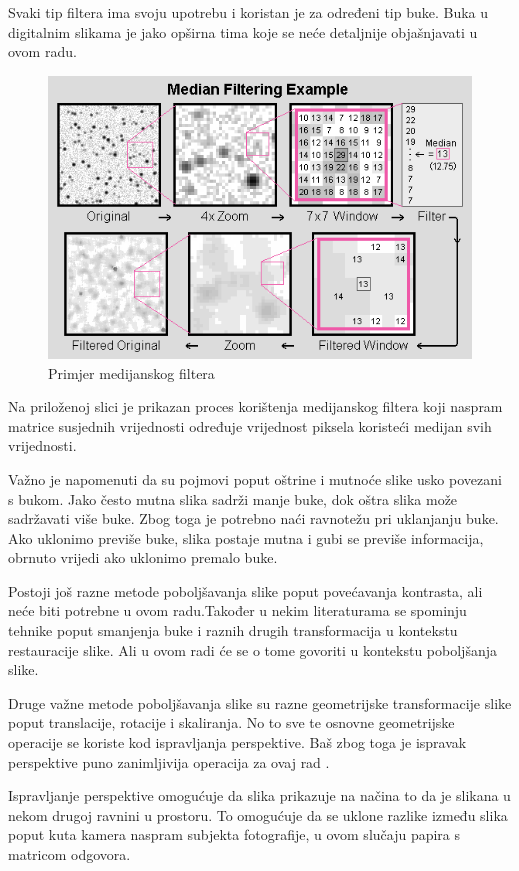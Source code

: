 \documentclass{foi}
\begin{document}
Svaki tip filtera ima svoju upotrebu i koristan je za određeni tip buke. Buka u digitalnim slikama je jako opširna tima koje se neće detaljnije objašnjavati u ovom radu.

\begin{figure}[H]
    \centering
    \includegraphics[width=0.85\linewidth]{slike/MedianFiltering.png}
    \caption{Primjer medijanskog filtera \cite{MeidanFilter}}
\end{figure}

Na priloženoj slici je prikazan proces korištenja medijanskog filtera koji naspram matrice susjednih vrijednosti određuje vrijednost piksela koristeći medijan svih vrijednosti.

Važno je napomenuti da su pojmovi poput oštrine i mutnoće  slike usko povezani s bukom. Jako često mutna slika sadrži manje buke, dok oštra slika može sadržavati više buke. Zbog toga je potrebno naći ravnotežu pri uklanjanju buke. Ako uklonimo previše buke, slika postaje mutna i gubi se previše informacija, obrnuto vrijedi ako uklonimo premalo buke.

Postoji još razne metode poboljšavanja slike poput povećavanja kontrasta, ali neće biti potrebne u ovom radu.Također u nekim literaturama se spominju tehnike poput smanjenja buke  i raznih drugih transformacija u kontekstu restauracije slike. Ali u ovom radi će se o tome govoriti u kontekstu poboljšanja slike.

Druge važne metode poboljšavanja slike su razne geometrijske transformacije slike poput translacije, rotacije i skaliranja. No to sve te osnovne geometrijske operacije se koriste kod ispravljanja perspektive. Baš zbog toga je ispravak perspektive puno zanimljivija operacija za ovaj rad \cite{GeometryTransforms}.  

Ispravljanje perspektive omogućuje da slika prikazuje na načina to da je slikana u nekom drugoj ravnini u prostoru. To omogućuje da se uklone razlike između slika poput kuta kamera naspram subjekta fotografije, u ovom slučaju papira s matricom odgovora. 
\end{document}
